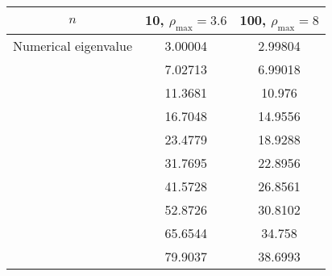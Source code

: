 \begin{table}  %
\begin{adjustbox}{width=\linewidth}
\begin{tabular}{||c | c | c||}
\hline
$n$ & 10, $\rho_{\text{max}}=3.6$ & 100, $\rho_{\text{max}}=8$    \\ \hline
Numerical eigenvalue & 3.00004 & 2.99804    \\ \hline
  & 7.02713 & 6.99018    \\ \hline
  & 11.3681 & 10.976    \\ \hline
  & 16.7048 & 14.9556    \\ \hline
  & 23.4779 & 18.9288    \\ \hline
  & 31.7695 & 22.8956    \\ \hline
  & 41.5728 & 26.8561    \\ \hline
  & 52.8726 & 30.8102    \\ \hline
  & 65.6544 & 34.758    \\ \hline
  & 79.9037 & 38.6993    \\ \hline
\end{tabular}
\end{adjustbox}
\caption{}
\label{}
\end{table}
